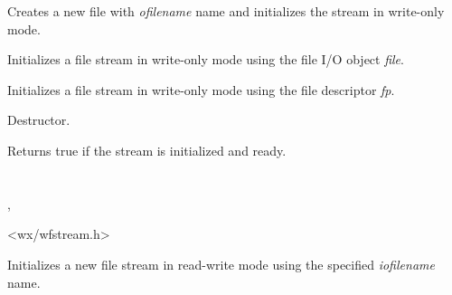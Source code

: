
\label{wxffileoutputstreamctor}


Creates a new file with {\it ofilename} name and initializes the stream in
write-only mode. 


Initializes a file stream in write-only mode using the file I/O object {\it file}.


Initializes a file stream in write-only mode using the file descriptor {\it fp}.

\label{wxffileoutputstreamdtor}


Destructor.

\label{wxffileoutputstreamok}


Returns true if the stream is initialized and ready.

\section{}\label{wxffilestream}


, 


<wx/wfstream.h>




\label{wxffilestreamctor}


Initializes a new file stream in read-write mode using the specified 
{\it iofilename} name.


